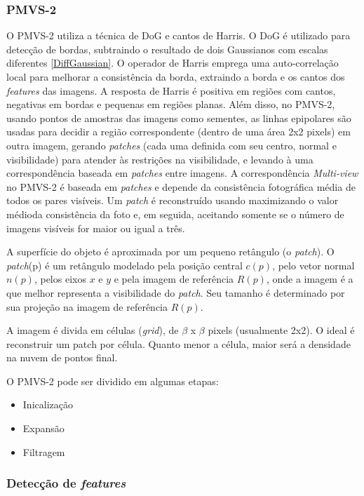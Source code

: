 \begin{itemize}
\subsubsection*{PMVS-2}

O PMVS-2 utiliza a técnica de DoG e cantos de Harris. O DoG é utilizado para detecção de bordas, subtraindo o resultado de dois Gaussianos com escalas diferentes \ref{DiffGaussian}. O operador de Harris emprega uma auto-correlação local para melhorar a consistência da borda, extraindo a borda e os cantos dos \emph{features} das imagens. A resposta de Harris é positiva em regiões com cantos, negativas em bordas e pequenas em regiões planas. Além disso, no PMVS-2, usando pontos de amostras das imagens como sementes, as linhas epipolares são usadas para decidir a região correspondente (dentro de uma área 2x2 pixels) em outra imagem, gerando \emph{patches} (cada uma definida com seu centro, normal e visibilidade) para atender às restrições na visibilidade, e levando à uma correspondência baseada em \emph{patches} entre imagens. A correspondência \emph{Multi-view} no PMVS-2 é baseada em \emph{patches} e depende da consistência fotográfica média de todos os pares visíveis. Um \emph{patch} é reconstruído usando maximizando o valor médioda consistência da foto e, em seguida, aceitando somente se o número de imagens visíveis for maior ou igual a três.  

A superfície do objeto é aproximada por um pequeno retângulo (o \emph{patch}).
O \emph{patch}(p) é um retângulo modelado pela posição central $c(p)$, pelo vetor normal $n(p)$, pelos eixos $x$ e $y$ e pela imagem de referência $R(p)$, onde a imagem é a que melhor representa a visibilidade do \emph{patch}. Seu tamanho é determinado por sua projeção na imagem de referência $R(p)$.

A imagem é divida em células (\emph{grid}), de $\beta$ x $\beta$ pixels (usualmente 2x2). O ideal é reconstruir um patch por célula. Quanto menor a célula, maior será a densidade na nuvem de pontos final.

O PMVS-2 pode ser dividido em algumas etapas:

\begin{itemize}
\item{Inicalização}
\item{Expansão}
\item{Filtragem}
\end{itemize}

\subsubsection*{Detecção de \emph{features}}


\end{itemize}
